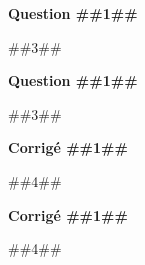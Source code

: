 \documentclass[11pt]{article}
\begin{document}



\begin{minipage}{\linewidth}

\raggedcolumns
\setlength{\columnseprule}{0.5pt}
\begin{multicols}{2}

\textbf{Question ##{{1}}##} \par
##{{3}}##

\columnbreak

\textbf{Question ##{{1}}##} \par
##{{3}}##

\end{multicols}
\end{minipage}




\begin{minipage}{\linewidth}

\raggedcolumns
\setlength{\columnseprule}{0.5pt}
\begin{multicols}{2}

\textbf{Corrigé ##{{1}}##} \par
##{{4}}##

\columnbreak

\textbf{Corrigé ##{{1}}##} \par
##{{4}}##

\end{multicols}
\end{minipage}



\end{document}
